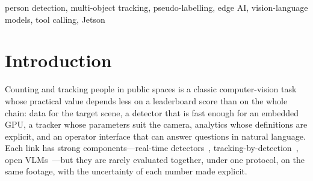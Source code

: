 \documentclass[conference]{IEEEtran}
\begin{document}
\begin{IEEEkeywords}
person detection, multi-object tracking, pseudo-labelling, edge AI, vision-language models, tool calling, Jetson
\end{IEEEkeywords}

\section{Introduction}
Counting and tracking people in public spaces is a classic computer-vision task whose practical value depends less
on a leaderboard score than on the whole chain: data for the target scene, a detector that is fast enough for an
embedded GPU, a tracker whose parameters suit the camera, analytics whose definitions are explicit, and an
operator interface that can answer questions in natural language. Each link has strong components---real-time
detectors~\cite{redmon2016yolo,wang2024yolov10,jocher2026yolo26,zhao2024rtdetr,robinson2026rfdetr},
tracking-by-detection~\cite{bewley2016sort,zhang2022bytetrack,cao2023ocsort}, open VLMs~\cite{bai2025qwen3vl}---but
they are rarely evaluated together, under one protocol, on the same footage, with the uncertainty of each number
made explicit.
\end{document}
